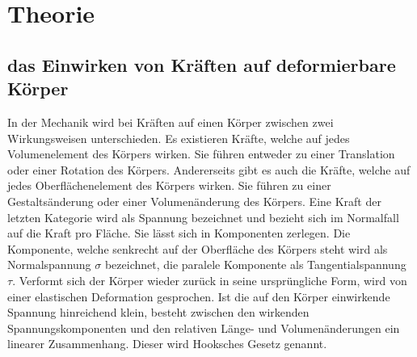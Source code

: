 
\section{Theorie}
\label{sec:Theorie}

\subsection{das Einwirken von Kräften auf deformierbare Körper}
In der Mechanik wird bei Kräften auf einen Körper zwischen zwei Wirkungsweisen unterschieden.
 Es existieren Kräfte, welche auf jedes Volumenelement des Körpers wirken. Sie
  führen entweder zu einer Translation oder einer Rotation des Körpers.
  Andererseits gibt es auch die Kräfte, welche auf jedes Oberflächenelement des Körpers wirken.
    Sie führen zu einer Gestaltsänderung oder einer Volumenänderung des Körpers.
    Eine Kraft der letzten Kategorie wird als Spannung bezeichnet und bezieht sich im Normalfall
     auf die Kraft pro Fläche. Sie lässt sich in Komponenten zerlegen.
     Die Komponente, welche senkrecht auf der Oberfläche des Körpers steht
      wird als Normalspannung $\sigma$ bezeichnet,
       die paralele Komponente als Tangentialspannung $\tau$.
       Verformt sich der Körper wieder zurück in seine ursprüngliche Form,
        wird von einer elastischen Deformation gesprochen.
        Ist die auf den Körper einwirkende Spannung hinreichend klein,
         besteht zwischen den wirkenden Spannungskomponenten
          und den relativen Länge- und Volumenänderungen ein linearer
           Zusammenhang. Dieser wird Hooksches Gesetz genannt.



